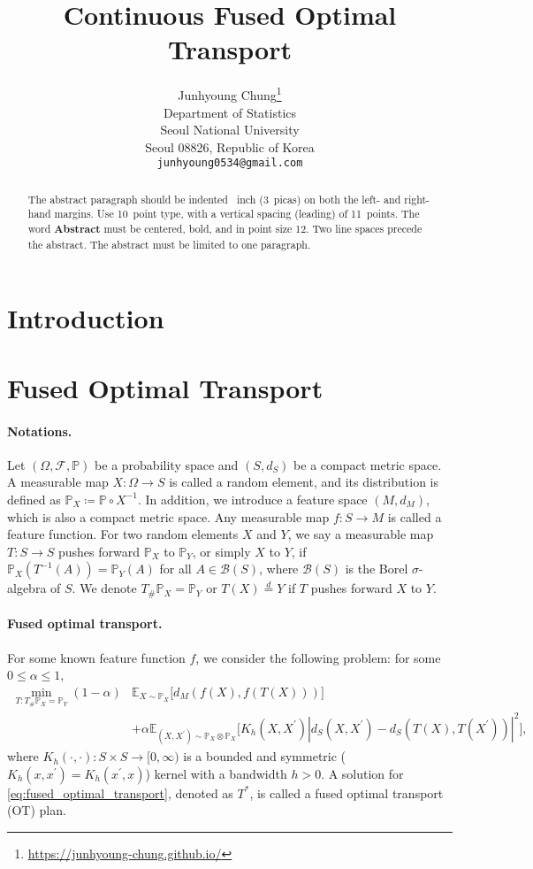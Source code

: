 \documentclass{article}
\title{Continuous Fused Optimal Transport}
\author{%
  Junhyoung Chung\thanks{\href{https://junhyoung-chung.github.io/}{https://junhyoung-chung.github.io/}} \\
  Department of Statistics\\
  Seoul National University\\
  Seoul 08826, Republic of Korea \\
  \texttt{junhyoung0534@gmail.com} \\
}
\begin{document}
\maketitle


\begin{abstract}
  The abstract paragraph should be indented ~inch (3~picas) on
  both the left- and right-hand margins. Use 10~point type, with a vertical
  spacing (leading) of 11~points.  The word \textbf{Abstract} must be centered,
  bold, and in point size 12. Two line spaces precede the abstract. The abstract
  must be limited to one paragraph.
\end{abstract}


\section{Introduction}

\section{Fused Optimal Transport}
\paragraph{Notations.} Let $(\Omega,\mathcal{F},\mathbb{P})$ be a probability space and $(S,d_S)$ be a compact metric space. A measurable map $X: \Omega \to S$ is called a random element, and its distribution is defined as $\mathbb{P}_X \coloneqq \mathbb{P} \circ X^{-1}$. In addition, we introduce a feature space $(M,d_M)$, which is also a compact metric space. Any measurable map $f : S \to M$ is called a feature function.
For two random elements $X$ and $Y$, we say a measurable map $T: S \to S$ pushes forward $\mathbb{P}_X$ to $\mathbb{P}_Y$, or simply $X$ to $Y$, if $\mathbb{P}_X(T^{-1}(A)) = \mathbb{P}_Y(A)$ for all $A \in \mathcal{B}(S)$, where $\mathcal{B}(S)$ is the Borel $\sigma$-algebra of $S$. We denote $T_{\#}\mathbb{P}_X = \mathbb{P}_Y$ or $T(X) \overset{d}{=} Y$ if $T$ pushes forward $X$ to $Y$.

\paragraph{Fused optimal transport.} For some known feature function $f$, we consider the following problem: for some $0 \leq \alpha \leq 1$,
\begin{align}
	\label{eq:fused_optimal_transport}
	\min_{T: T_{\#}\mathbb{P}_X = \mathbb{P}_Y} (1-\alpha)&\mathbb{E}_{X \sim \mathbb{P}_X} \Big[d_M(f(X),f(T(X)))\Big] \nonumber\\
	&+ \alpha \mathbb{E}_{(X,X^\prime) \sim \mathbb{P}_X \otimes \mathbb{P}_X}\Big[K_h(X,X^\prime)\left\vert d_S(X,X^\prime) - d_S(T(X),T(X^\prime)) \right\vert^2\Big] ,
\end{align}
where $K_h(\cdot,\cdot): S \times S \to [0,\infty)$ is a bounded and symmetric ($K_h(x,x^\prime) = K_h(x^\prime,x)$) kernel with a bandwidth $h > 0$. A solution for \eqref{eq:fused_optimal_transport}, denoted as $T^\ast$, is called a fused optimal transport (OT) plan.
\end{document}
